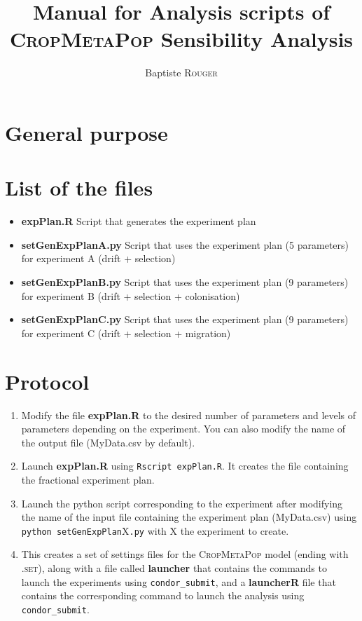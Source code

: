 \documentclass[10pt,a4paper]{article}
\title{Manual for Analysis scripts of \textsc{CropMetaPop} Sensibility Analysis}
\author{Baptiste \textsc{Rouger}}
\begin{document}
\maketitle
\section{General purpose}
\section{List of the files}
\begin{itemize}
        \item \textbf{expPlan.R} Script that generates the experiment plan
        \item \textbf{setGenExpPlanA.py} Script that uses the experiment plan (5 parameters) for experiment A (drift + selection)
        \item \textbf{setGenExpPlanB.py} Script that uses the experiment plan (9 parameters) for experiment B (drift + selection + colonisation)
        \item \textbf{setGenExpPlanC.py} Script that uses the experiment plan (9 parameters) for experiment C (drift + selection + migration)
\end{itemize}

\section{Protocol}
\begin{enumerate}
        \item Modify the file \textbf{expPlan.R} to the desired number of parameters and levels of parameters depending on the experiment. You can also modify the name of the output file (MyData.csv by default).
    \item Launch \textbf{expPlan.R} using \texttt{Rscript expPlan.R}. It creates the file containing the fractional experiment plan.
    \item Launch the python script corresponding to the experiment after modifying the name of the input file containing the experiment plan (MyData.csv) using \texttt{python setGenExpPlan}X\texttt{.py} with X the experiment to create.
    \item This creates a set of settings files for the \textsc{CropMetaPop} model (ending with \textsc{.set}), along with a file called \textbf{launcher} that contains the commands to launch the experiments using \texttt{condor\_submit}, and a \textbf{launcherR} file that contains the corresponding command to launch the analysis using \texttt{condor\_submit}.
\end{enumerate}
\end{document}
